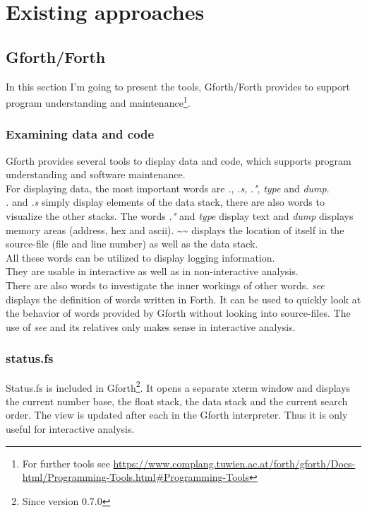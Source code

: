\section{Existing approaches}

\subsection{Gforth/Forth}

In this section I'm going to present the tools, Gforth/Forth provides to support program understanding and maintenance\footnote{For further tools see \url{https://www.complang.tuwien.ac.at/forth/gforth/Docs-html/Programming-Tools.html\#Programming-Tools}}.

\subsubsection*{Examining data and code}
Gforth provides several tools to display data and code, which supports program understanding and software maintenance.\\
For displaying data, the most important words are \emph{.}, \emph{.s}, \emph{."}, \emph{type} and \emph{dump}.\\
\emph{.} and \emph{.s} simply display elements of the data stack, there are also words to visualize the other stacks.
The words \emph{."} and \emph{type} display text and \emph{dump} displays memory areas (address, hex and ascii).
\textasciitilde\textasciitilde\:  displays the location of itself in the source-file (file and line number) as well as the data stack.\\
All these words can be utilized to display logging information.\\
They are usable in interactive as well as in non-interactive analysis.\\
There are also words to investigate the inner workings of other words. 
\emph{see} displays the definition of words written in Forth. It can be used to quickly look at the behavior of words provided by Gforth without looking into source-files. The use of \emph{see} and its relatives only makes sense in interactive analysis.

\subsubsection*{status.fs}
Status.fs is included in Gforth\footnote{Since version 0.7.0}. It opens a separate xterm window and displays the current number base, the float stack, the data stack and the current search order. The view is updated after each \keys{\return} in the Gforth interpreter. Thus it is only useful for interactive analysis.


